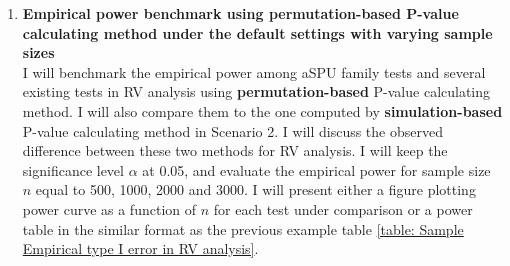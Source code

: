 \documentclass[12pt]{article}
\begin{document}
\begin{enumerate}
\item \textbf{Empirical power benchmark using permutation-based P-value calculating method under the default settings with varying sample sizes}\\
I will benchmark the empirical power among aSPU family tests and several existing tests in RV analysis using \textbf{permutation-based} P-value calculating method. I will also compare them to the one computed by \textbf{simulation-based} P-value calculating method in Scenario 2. I will discuss the observed difference between these two methods for RV analysis. I will keep the significance level $\alpha$ at 0.05, and evaluate the empirical power for sample size $n$ equal to 500, 1000, 2000 and 3000. I will present either a figure plotting power curve as a function of $n$ for each test under comparison or a power table in the similar format as the previous example table \ref{table: Sample Empirical type I error in RV analysis}.


\end{enumerate}
\end{document}
